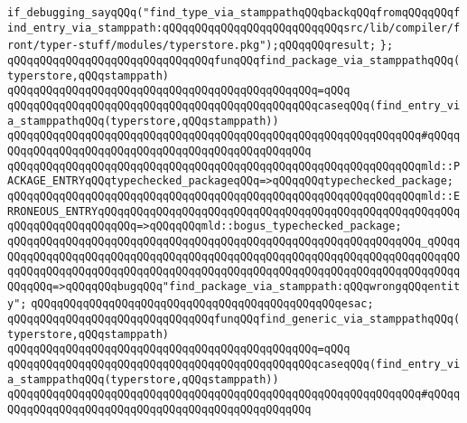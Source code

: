 \newline
\verb|if_debugging_sayqQQq("find_type_via_stamppathqQQqbackqQQqfromqQQqqQQqfind_entry_via_stamppath:qQQqqQQqqQQqqQQqqQQqqQQqqQQqsrc/lib/compiler/front/typer-stuff/modules/typerstore.pkg");qQQqqQQqresult;|\newline
\verb|};|\newline
\newline
\verb|qQQqqQQqqQQqqQQqqQQqqQQqqQQqqQQqfunqQQqfind_package_via_stamppathqQQq(typerstore,qQQqstamppath)|\newline
\verb|qQQqqQQqqQQqqQQqqQQqqQQqqQQqqQQqqQQqqQQqqQQqqQQq=qQQq|\newline
\verb|qQQqqQQqqQQqqQQqqQQqqQQqqQQqqQQqqQQqqQQqqQQqqQQqcaseqQQq(find_entry_via_stamppathqQQq(typerstore,qQQqstamppath))|\newline
\verb|qQQqqQQqqQQqqQQqqQQqqQQqqQQqqQQqqQQqqQQqqQQqqQQqqQQqqQQqqQQqqQQq#qQQqqQQqqQQqqQQqqQQqqQQqqQQqqQQqqQQqqQQqqQQqqQQqqQQq|\newline
\verb|qQQqqQQqqQQqqQQqqQQqqQQqqQQqqQQqqQQqqQQqqQQqqQQqqQQqqQQqqQQqqQQqmld::PACKAGE_ENTRYqQQqtypechecked_packageqQQq=>qQQqqQQqtypechecked_package;|\newline
\verb|qQQqqQQqqQQqqQQqqQQqqQQqqQQqqQQqqQQqqQQqqQQqqQQqqQQqqQQqqQQqqQQqmld::ERRONEOUS_ENTRYqQQqqQQqqQQqqQQqqQQqqQQqqQQqqQQqqQQqqQQqqQQqqQQqqQQqqQQqqQQqqQQqqQQqqQQqqQQq=>qQQqqQQqmld::bogus_typechecked_package;|\newline
\verb|qQQqqQQqqQQqqQQqqQQqqQQqqQQqqQQqqQQqqQQqqQQqqQQqqQQqqQQqqQQqqQQq_qQQqqQQqqQQqqQQqqQQqqQQqqQQqqQQqqQQqqQQqqQQqqQQqqQQqqQQqqQQqqQQqqQQqqQQqqQQqqQQqqQQqqQQqqQQqqQQqqQQqqQQqqQQqqQQqqQQqqQQqqQQqqQQqqQQqqQQqqQQqqQQqqQQqqQQq=>qQQqqQQqbugqQQq"find_package_via_stamppath:qQQqwrongqQQqentity";|\newline
\verb|qQQqqQQqqQQqqQQqqQQqqQQqqQQqqQQqqQQqqQQqqQQqqQQqesac;|\newline
\newline
\newline
\verb|qQQqqQQqqQQqqQQqqQQqqQQqqQQqqQQqfunqQQqfind_generic_via_stamppathqQQq(typerstore,qQQqstamppath)|\newline
\verb|qQQqqQQqqQQqqQQqqQQqqQQqqQQqqQQqqQQqqQQqqQQqqQQq=qQQq|\newline
\verb|qQQqqQQqqQQqqQQqqQQqqQQqqQQqqQQqqQQqqQQqqQQqqQQqcaseqQQq(find_entry_via_stamppathqQQq(typerstore,qQQqstamppath))|\newline
\verb|qQQqqQQqqQQqqQQqqQQqqQQqqQQqqQQqqQQqqQQqqQQqqQQqqQQqqQQqqQQqqQQq#qQQqqQQqqQQqqQQqqQQqqQQqqQQqqQQqqQQqqQQqqQQqqQQqqQQq|\newline
